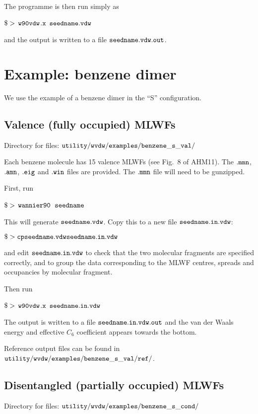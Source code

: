 \documentclass{report}
\newcommand{\wvdw}{{$\tt{w90vdw}$}}
\newcommand{\wannier}{{$\tt{wannier90}$}}
\begin{document}
The programme is then run simply as

$\tt{\$>}$ \wvdw$\tt{.x}$ $\tt{seedname.vdw}$

and the output is written to a file $\tt{seedname.vdw.out}$. 

\section{Example: benzene dimer}

We use the example of a benzene dimer in the ``S''
configuration.

\subsection{Valence (fully occupied) MLWFs}

Directory for files: $\tt{utility/wvdw/examples/benzene\_s\_val/}$

Each benzene molecule has 15 valence MLWFs (see Fig.~8 of AHM11).  The
$\tt{.mmn}$, $\tt{.amn}$, $\tt{.eig}$ and $\tt{.win}$ files are
provided. The $\tt{.mmn}$ file will need to be gunzipped.

First, run 

$\tt{\$>}$ \wannier\ $\tt{seedname}$

This will generate $\tt{seedname.vdw}$. Copy this to a new file
$\tt{seedname.in.vdw}$:

$\tt{\$> cp seedname.vdw seedname.in.vdw}$

and edit $\tt{seedname.in.vdw}$ to check that the two molecular
fragments are specified correctly, and to group the data corresponding
to the MLWF centres, spreads and occupancies by molecular fragment. 

Then run 

$\tt{\$>}$ \wvdw$\tt{.x}$ $\tt{seedname.in.vdw}$

The output is written to a file $\tt{seedname.in.vdw.out}$ and the van der Waals
energy and effective $C_6$ coefficient appears towards the bottom.

Reference output files can be found in  $\tt{utility/wvdw/examples/benzene\_s\_val/ref/}$.

\subsection{Disentangled (partially occupied) MLWFs}

Directory for files: $\tt{utility/wvdw/examples/benzene\_s\_cond/}$
\end{document}

